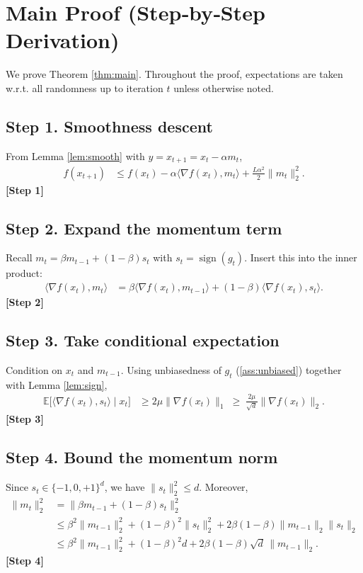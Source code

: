 \documentclass{article}
\newcommand{\sign}{\operatorname{sign}}
\newcommand{\E}{\mathbb{E}}
\begin{document}
\section*{Main Proof (Step‑by‑Step Derivation)}
We prove Theorem \ref{thm:main}. Throughout the proof, expectations are taken w.r.t. all randomness up to iteration $t$ unless otherwise noted.  

\subsection*{Step 1. Smoothness descent}
From Lemma \ref{lem:smooth} with $y=x_{t+1}=x_t-\alpha m_t$,
\begin{align}
f(x_{t+1}) &\le f(x_t)-\alpha\langle\nabla f(x_t),m_t\rangle
               +\frac{L\alpha^{2}}{2}\|m_t\|_{2}^{2}. \tag{2}
\end{align}
\textbf{[Step 1]}

\subsection*{Step 2. Expand the momentum term}
Recall $m_t=\beta m_{t-1}+(1-\beta)s_t$ with $s_t=\sign(g_t)$.  
Insert this into the inner product:
\begin{align}
\langle\nabla f(x_t),m_t\rangle
&= \beta\langle\nabla f(x_t),m_{t-1}\rangle
   +(1-\beta)\langle\nabla f(x_t),s_t\rangle . \tag{3}
\end{align}
\textbf{[Step 2]}

\subsection*{Step 3. Take conditional expectation}
Condition on $x_t$ and $m_{t-1}$.
Using unbiasedness of $g_t$ (\ref{ass:unbiased}) together with Lemma \ref{lem:sign},
\begin{align}
\E\!\bigl[\langle\nabla f(x_t),s_t\rangle\mid x_t\bigr]
&\ge 2\mu\|\nabla f(x_t)\|_{1}
 \;\ge\; \frac{2\mu}{\sqrt{d}}\|\nabla f(x_t)\|_{2}. \tag{4}
\end{align}
\textbf{[Step 3]}

\subsection*{Step 4. Bound the momentum norm}
Since $s_t\in\{-1,0,+1\}^{d}$, we have $\|s_t\|_{2}^{2}\le d$. Moreover,
\begin{align}
\|m_t\|_{2}^{2}
&= \|\beta m_{t-1}+(1-\beta)s_t\|_{2}^{2} \nonumber\\
&\le \beta^{2}\|m_{t-1}\|_{2}^{2} + (1-\beta)^{2}\|s_t\|_{2}^{2}
      +2\beta(1-\beta)\|m_{t-1}\|_{2}\|s_t\|_{2} \nonumber\\
&\le \beta^{2}\|m_{t-1}\|_{2}^{2} + (1-\beta)^{2}d
      +2\beta(1-\beta)\sqrt{d}\,\|m_{t-1}\|_{2}. \tag{5}
\end{align}
\textbf{[Step 4]}
\end{document}
